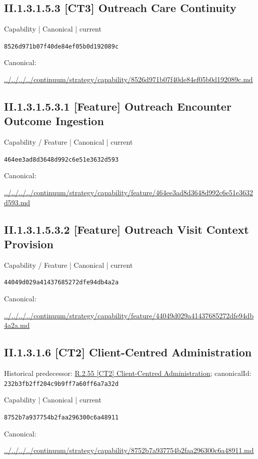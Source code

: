 \documentclass[10pt,a4paper]{article}
\begin{document}
\subsection*{II.1.3.1.5.3 [CT3] Outreach Care Continuity}
\label{element-8526d971b07f40de84ef05b0d192089c}
{\small Capability | Canonical | current}\par
\texttt{8526d971b07f40de84ef05b0d192089c}\par
Canonical: \par
{\footnotesize\url{../../../../continuum/strategy/capability/8526d971b07f40de84ef05b0d192089c.md}}\par
\subsection*{II.1.3.1.5.3.1 [Feature] Outreach Encounter Outcome Ingestion}
\label{element-464ee3ad8d3648d992c6e51e3632d593}
{\small Capability / Feature | Canonical | current}\par
\texttt{464ee3ad8d3648d992c6e51e3632d593}\par
Canonical: \par
{\footnotesize\url{../../../../continuum/strategy/capability/feature/464ee3ad8d3648d992c6e51e3632d593.md}}\par
\subsection*{II.1.3.1.5.3.2 [Feature] Outreach Visit Context Provision}
\label{element-44049d029a41437685272dfe94db4a2a}
{\small Capability / Feature | Canonical | current}\par
\texttt{44049d029a41437685272dfe94db4a2a}\par
Canonical: \par
{\footnotesize\url{../../../../continuum/strategy/capability/feature/44049d029a41437685272dfe94db4a2a.md}}\par
\subsection*{II.1.3.1.6 [CT2] Client-Centred Administration}
Historical predecessor: \hyperref[element-232b3fb2ff204c9b9ff7a60ff6a7a32d]{R.2.55 [CT2] Client-Centred Administration}; canonicalId: \texttt{232b3fb2ff204c9b9ff7a60ff6a7a32d}\par
\label{element-8752b7a937754b2faa296300c6a48911}
{\small Capability | Canonical | current}\par
\texttt{8752b7a937754b2faa296300c6a48911}\par
Canonical: \par
{\footnotesize\url{../../../../continuum/strategy/capability/8752b7a937754b2faa296300c6a48911.md}}\par
\end{document}
